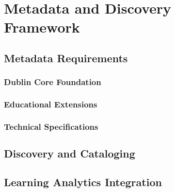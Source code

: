 \section{Metadata and Discovery Framework}
\label{sec:metadata}


\subsection{Metadata Requirements}

\subsubsection{Dublin Core Foundation}

\subsubsection{Educational Extensions}

\subsubsection{Technical Specifications}

\subsection{Discovery and Cataloging}

\subsection{Learning Analytics Integration}

